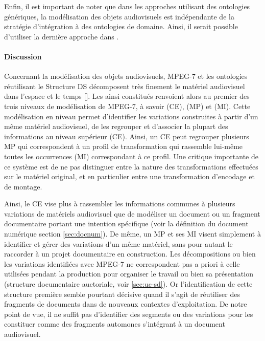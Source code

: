 Enfin, il est important de noter que dans les approches utilisant des ontologies génériques, la modélisation des objets audiovisuels est indépendante de la stratégie d'intégration à des ontologies de domaine.
Ainsi, il serait possible d'utiliser la dernière approche dans .

\paragraph{Discussion}
Concernant la modélisation des objets audiovisuels, MPEG-7 et les ontologies réutilisant le Structure DS décomposent très finement le matériel audiovisuel dans l'espace et le temps [].
Les  ainsi constitués renvoient alors au premier des trois niveaux de modélisation de MPEG-7, à savoir  (CE),  (MP) et  (MI).
Cette modélisation en niveau permet d'identifier les variations construites à partir d'un même matériel audiovisuel, de les regrouper et d'associer la plupart des informations au niveau supérieur (CE).
Ainsi, un CE peut regrouper plusieurs MP qui correspondent à un profil de transformation qui rassemble lui-même toutes les occurrences (MI) correspondant à ce profil.
Une critique importante de ce système est de ne pas distinguer entre la nature des transformations effectuées sur le matériel original, et en particulier entre une transformation d'encodage et de montage.

Ainsi, le CE vise plus à rassembler les informations communes à plusieurs variations de matériels audiovisuel que de modéliser un document ou un fragment documentaire portant une intention spécifique (voir la définition du document numérique section \ref{sec:docnum}).
De même, un MP et ses MI visent simplement à identifier et gérer des variations d'un même matériel, sans pour autant le raccorder à un projet documentaire en construction.
Les décompositions ou bien les variations identifiées avec MPEG-7 ne correspondent pas a priori à celle utilisées pendant la production pour organiser le travail ou bien sa présentation (structure documentaire auctoriale, voir \ref{sec:uc-sd}).
Or l'identification de cette structure première semble pourtant décisive quand il s'agit de réutiliser des fragments de documents dans de nouveaux contextes d'exploitation. 
De notre point de vue, il ne suffit pas d'identifier des segments ou des variations pour les constituer comme des fragments automones s'intégrant à un document audiovisuel.


